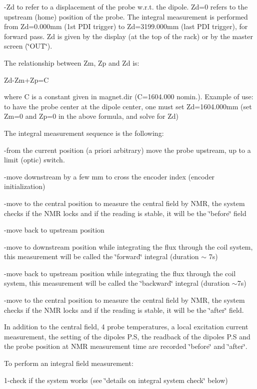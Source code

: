 -Zd to refer to a displacement of the probe w.r.t. the dipole. Zd=0 refers to
the upstream (home) position of the probe. The integral measurement is performed
from Zd=0.000mm (1st PDI trigger) to Zd=3199.000mm (last PDI trigger), for forward
pass. Zd is given by the display (at the top of the rack) or by the master screen
(\char`\"{}OUT\char`\"{}). 

The relationship between Zm, Zp and Zd is: 

Zd-Zm+Zp=C 

where C is a constant given in magnet.dir (C=1604.000 nomin.). Example of use:
to have the probe center at the dipole center, one must set Zd=1604.000mm (set
Zm=0 and Zp=0 in the above formula, and solve for Zd) 

The integral measurement sequence is the following: 

-from the current position (a priori arbitrary) move the probe upstream, up
to a limit (optic) switch. 

-move downstream by a few mm to cross the encoder index (encoder initialization) 

-move to the central position to measure the central field by NMR, the system
checks if the NMR locks and if the reading is stable, it will be the 
\char`\"{}before\char`\"{}
field 

-move back to upstream position 

-move to downstream position while integrating the flux through the coil system,
this measurement will be called the \char`\"{}forward\char`\"{} integral (duration
\( \sim  \) 7s) 

-move back to upstream position while integrating the flux through the coil
system, this measurement will be called the \char`\"{}backward\char`\"{} integral
(duration \( \sim  \)7s) 

-move to the central position to measure the central field by NMR, the system
checks if the NMR locks and if the reading is stable, it will be the 
\char`\"{}after\char`\"{}
field. 

In addition to the central field, 4 probe temperatures, a local excitation current
measurement, the setting of the dipoles P.S, the readback of the dipoles P.S
and the probe position at NMR measurement time are recorded 
\char`\"{}before\char`\"{}
and \char`\"{}after\char`\"{}. 

To perform an integral field measurement: 

1-check if the system works (see \char`\"{}details on integral system 
check\char`\"{}
below) 

